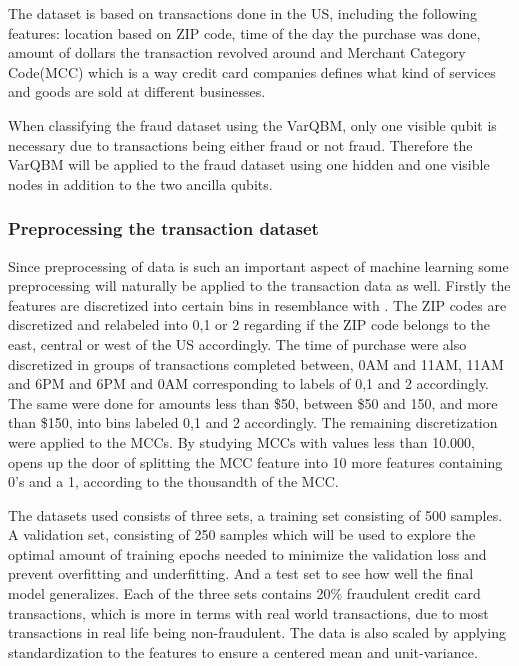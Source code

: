 \documentclass[../main.tex]{subfiles}
\begin{document}
The dataset is based on transactions done in the US, including the following features: location based on ZIP code, time of the day the purchase was done, amount of dollars the transaction revolved around and Merchant Category Code(MCC) which is a way credit card companies defines what kind of services and goods are sold at different businesses.

When classifying the fraud dataset using the VarQBM, only one visible qubit is necessary due to transactions being either fraud or not fraud. Therefore the VarQBM will be applied to the fraud dataset using one hidden and one visible nodes in addition to the two ancilla qubits.

\subsubsection{Preprocessing the transaction dataset}
Since preprocessing of data is such an important aspect of machine learning some preprocessing will naturally be applied to the transaction data as well. Firstly the features are discretized into certain bins in resemblance with \cite{VQB:litteraturelist}. The ZIP codes are discretized and relabeled into 0,1 or 2 regarding if the ZIP code belongs to the east, central or west of the US accordingly. The time of purchase were also discretized in groups of transactions completed between, 0AM and 11AM, 11AM and 6PM and 6PM and 0AM corresponding to labels of 0,1 and 2 accordingly. The same were done for amounts less than \$50, between \$50 and 150, and more than \$150, into bins labeled 0,1 and 2 accordingly. The remaining discretization were applied to the MCCs. By studying MCCs with values less than 10.000, opens up the door of splitting the MCC feature into 10 more features containing 0's and a 1, according to the thousandth of the MCC.

The datasets used consists of three sets, a training set consisting of 500 samples. A validation set, consisting of 250 samples which will be used to explore the optimal amount of training epochs needed to minimize the validation loss and prevent overfitting and underfitting. And a test set to see how well the final model generalizes. Each of the three sets contains 20\% fraudulent credit card transactions, which is more in terms with real world transactions, due to most transactions in real life being non-fraudulent. The data is also scaled by applying standardization to the features to ensure a centered mean and unit-variance.
\end{document}
